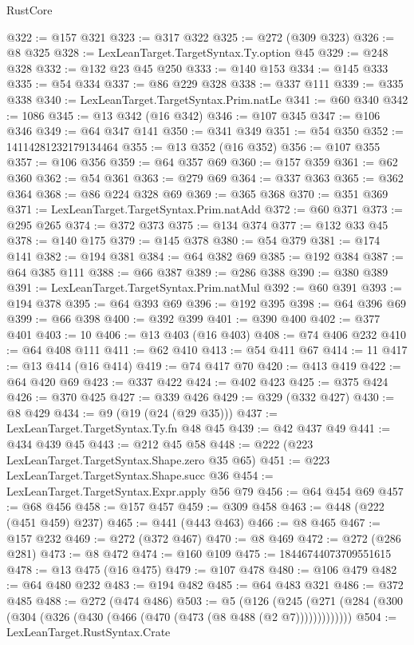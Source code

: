 \begin{lexlean}{RustCore}
\begin{coremodule}
@322 := @157 @321
@323 := @317 @322
@325 := @272 (@309 @323)
@326 := @8 @325
@328 := LexLeanTarget.TargetSyntax.Ty.option @45
@329 := @248 @328
@332 := @132 @23 @45 @250
@333 := @140 @153
@334 := @145 @333
@335 := @54 @334
@337 := @86 @229 @328
@338 := @337 @111
@339 := @335 @338
@340 := LexLeanTarget.TargetSyntax.Prim.natLe
@341 := @60 @340
@342 := 1086
@345 := @13 @342 (@16 @342)
@346 := @107 @345
@347 := @106 @346
@349 := @64 @347 @141
@350 := @341 @349
@351 := @54 @350
@352 := 14114281232179134464
@355 := @13 @352 (@16 @352)
@356 := @107 @355
@357 := @106 @356
@359 := @64 @357 @69
@360 := @157 @359
@361 := @62 @360
@362 := @54 @361
@363 := @279 @69
@364 := @337 @363
@365 := @362 @364
@368 := @86 @224 @328 @69
@369 := @365 @368
@370 := @351 @369
@371 := LexLeanTarget.TargetSyntax.Prim.natAdd
@372 := @60 @371
@373 := @295 @265
@374 := @372 @373
@375 := @134 @374
@377 := @132 @33 @45
@378 := @140 @175
@379 := @145 @378
@380 := @54 @379
@381 := @174 @141
@382 := @194 @381
@384 := @64 @382 @69
@385 := @192 @384
@387 := @64 @385 @111
@388 := @66 @387
@389 := @286 @388
@390 := @380 @389
@391 := LexLeanTarget.TargetSyntax.Prim.natMul
@392 := @60 @391
@393 := @194 @378
@395 := @64 @393 @69
@396 := @192 @395
@398 := @64 @396 @69
@399 := @66 @398
@400 := @392 @399
@401 := @390 @400
@402 := @377 @401
@403 := 10
@406 := @13 @403 (@16 @403)
@408 := @74 @406 @232
@410 := @64 @408 @111
@411 := @62 @410
@413 := @54 @411 @67
@414 := 11
@417 := @13 @414 (@16 @414)
@419 := @74 @417 @70
@420 := @413 @419
@422 := @64 @420 @69
@423 := @337 @422
@424 := @402 @423
@425 := @375 @424
@426 := @370 @425
@427 := @339 @426
@429 := @329 (@332 @427)
@430 := @8 @429
@434 := @9 (@19 (@24 (@29 @35)))
@437 := LexLeanTarget.TargetSyntax.Ty.fn @48 @45
@439 := @42 @437 @49
@441 := @434 @439 @45
@443 := @212 @45 @58
@448 := @222 (@223 LexLeanTarget.TargetSyntax.Shape.zero @35 @65)
@451 := @223 LexLeanTarget.TargetSyntax.Shape.succ @36
@454 := LexLeanTarget.TargetSyntax.Expr.apply @56 @79
@456 := @64 @454 @69
@457 := @68 @456
@458 := @157 @457
@459 := @309 @458
@463 := @448 (@222 (@451 @459) @237)
@465 := @441 (@443 @463)
@466 := @8 @465
@467 := @157 @232
@469 := @272 (@372 @467)
@470 := @8 @469
@472 := @272 (@286 @281)
@473 := @8 @472
@474 := @160 @109
@475 := 18446744073709551615
@478 := @13 @475 (@16 @475)
@479 := @107 @478
@480 := @106 @479
@482 := @64 @480 @232
@483 := @194 @482
@485 := @64 @483 @321
@486 := @372 @485
@488 := @272 (@474 @486)
@503 := @5
    (@126 (@245 (@271 (@284 (@300 (@304 (@326 (@430 (@466 (@470 (@473 (@8 @488 (@2 @7)))))))))))))
@504 := LexLeanTarget.RustSyntax.Crate

\end{coremodule}
\end{lexlean}
